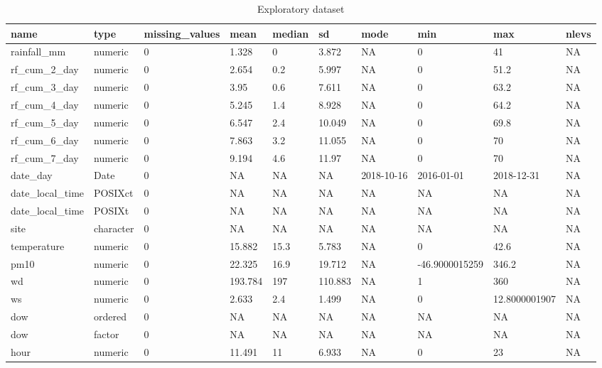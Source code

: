 \documentclass[12pt]{article}
\begin{document}
\begin{table}

\caption{\label{tab:unnamed-chunk-16}Exploratory dataset}
\centering
\begin{tabu} to 
\hline
name & type & missing\_values & mean & median & sd & mode & min & max & nlevs\\
\hline
rainfall\_mm & numeric & 0 & 1.328 & 0 & 3.872 & NA & 0 & 41 & NA\\
\hline
rf\_cum\_2\_day & numeric & 0 & 2.654 & 0.2 & 5.997 & NA & 0 & 51.2 & NA\\
\hline
rf\_cum\_3\_day & numeric & 0 & 3.95 & 0.6 & 7.611 & NA & 0 & 63.2 & NA\\
\hline
rf\_cum\_4\_day & numeric & 0 & 5.245 & 1.4 & 8.928 & NA & 0 & 64.2 & NA\\
\hline
rf\_cum\_5\_day & numeric & 0 & 6.547 & 2.4 & 10.049 & NA & 0 & 69.8 & NA\\
\hline
rf\_cum\_6\_day & numeric & 0 & 7.863 & 3.2 & 11.055 & NA & 0 & 70 & NA\\
\hline
rf\_cum\_7\_day & numeric & 0 & 9.194 & 4.6 & 11.97 & NA & 0 & 70 & NA\\
\hline
date\_day & Date & 0 & NA & NA & NA & 2018-10-16 & 2016-01-01 & 2018-12-31 & NA\\
\hline
date\_local\_time & POSIXct & 0 & NA & NA & NA & NA & NA & NA & NA\\
\hline
date\_local\_time & POSIXt & 0 & NA & NA & NA & NA & NA & NA & NA\\
\hline
site & character & 0 & NA & NA & NA & NA & NA & NA & NA\\
\hline
temperature & numeric & 0 & 15.882 & 15.3 & 5.783 & NA & 0 & 42.6 & NA\\
\hline
pm10 & numeric & 0 & 22.325 & 16.9 & 19.712 & NA & -46.9000015259 & 346.2 & NA\\
\hline
wd & numeric & 0 & 193.784 & 197 & 110.883 & NA & 1 & 360 & NA\\
\hline
ws & numeric & 0 & 2.633 & 2.4 & 1.499 & NA & 0 & 12.8000001907 & NA\\
\hline
dow & ordered & 0 & NA & NA & NA & NA & NA & NA & NA\\
\hline
dow & factor & 0 & NA & NA & NA & NA & NA & NA & NA\\
\hline
hour & numeric & 0 & 11.491 & 11 & 6.933 & NA & 0 & 23 & NA\\

\end{tabu}
\end{table}
\end{document}
